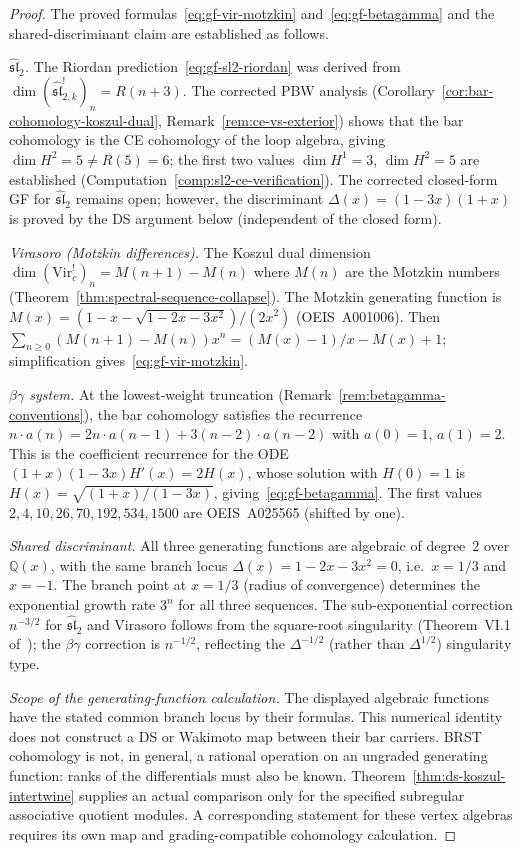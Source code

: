 \begin{proof}
The proved formulas~\eqref{eq:gf-vir-motzkin}
and~\eqref{eq:gf-betagamma} and the shared-discriminant
claim are established as follows.

\emph{$\widehat{\mathfrak{sl}}_2$.}
The Riordan prediction~\eqref{eq:gf-sl2-riordan}
was derived from
$\dim (\widehat{\mathfrak{sl}}_{2,k}^!)_n = R(n+3)$.
The corrected PBW analysis
(Corollary~\ref{cor:bar-cohomology-koszul-dual},
Remark~\ref{rem:ce-vs-exterior}) shows that the
bar cohomology is the CE cohomology of the loop algebra,
giving $\dim H^2 = 5 \neq R(5) = 6$;
the first two values $\dim H^1 = 3$, $\dim H^2 = 5$
are established
(Computation~\ref{comp:sl2-ce-verification}).
The corrected closed-form GF for
$\widehat{\mathfrak{sl}}_2$ remains open; however,
the discriminant $\Delta(x) = (1-3x)(1+x)$ is proved
by the DS argument below (independent of the closed form).

\emph{Virasoro (Motzkin differences).}
The Koszul dual dimension $\dim (\mathrm{Vir}_c^!)_n
= M(n{+}1) - M(n)$ where $M(n)$ are the Motzkin numbers
(Theorem~\ref{thm:spectral-sequence-collapse}).  The Motzkin
generating function is $M(x) = (1 - x - \sqrt{1-2x-3x^2})/(2x^2)$
(OEIS~A001006).  Then
$\sum_{n \geq 0}(M(n{+}1) - M(n))x^n = (M(x) - 1)/x - M(x) + 1$;
simplification gives~\eqref{eq:gf-vir-motzkin}.

\emph{$\beta\gamma$ system.}
At the lowest-weight truncation
(Remark~\ref{rem:betagamma-conventions}), the bar cohomology
satisfies the recurrence
$n \cdot a(n) = 2n \cdot a(n{-}1) + 3(n{-}2) \cdot a(n{-}2)$
with $a(0) = 1$, $a(1) = 2$.  This is the coefficient recurrence
for the ODE $(1{+}x)(1{-}3x)H'(x) = 2H(x)$, whose solution with
$H(0) = 1$ is $H(x) = \sqrt{(1{+}x)/(1{-}3x)}$,
giving~\eqref{eq:gf-betagamma}.
The first values $2, 4, 10, 26, 70, 192, 534, 1500$
are OEIS~A025565 (shifted by one).

\emph{Shared discriminant.}
All three generating functions are algebraic of degree~$2$ over
$\mathbb{Q}(x)$, with the same branch locus
$\Delta(x) = 1 - 2x - 3x^2 = 0$, i.e.\ $x = 1/3$ and $x = -1$.
The branch point at $x = 1/3$ (radius of convergence) determines the
exponential growth rate $3^n$ for all three sequences.
The sub-exponential correction $n^{-3/2}$ for
$\widehat{\mathfrak{sl}}_2$ and Virasoro follows from the
square-root singularity
(Theorem~VI.1 of~\cite{FlajoletSedgewick});
the $\beta\gamma$ correction is $n^{-1/2}$, reflecting the
$\Delta^{-1/2}$ (rather than $\Delta^{1/2}$) singularity type.

\emph{Scope of the generating-function calculation.}
The displayed algebraic functions have the stated common branch locus by their formulas.
This numerical identity does not construct a DS or Wakimoto map between their bar carriers.
BRST cohomology is not, in general, a rational operation on an ungraded generating function: ranks of the differentials must also be known.
Theorem~\ref{thm:ds-koszul-intertwine} supplies an actual comparison only for the specified subregular associative quotient modules.
A corresponding statement for these vertex algebras requires its own map and grading-compatible cohomology calculation.

\end{proof}

